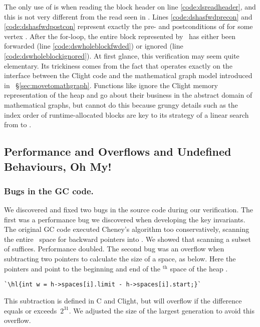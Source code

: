 The only use of  is when
reading the block header on line \ref{code:dsreadheader}, 
and this is not very different from the read seen in . 
Lines \ref{code:dshasfwdprecon} and \ref{code:dshasfwdpostcon} 
represent exactly the pre- and postconditions of 
for some vertex . 
After the for-loop, the entire block represented by~ has either been
forwarded (line \ref{code:dswholeblockfwded}) or 
ignored (line \ref{code:dswholeblockignored}). 
At first glance, this verification may seem quite elementary. 
Its trickiness comes from the fact
that  operates exactly on the interface between the Clight code 
and the mathematical graph model introduced in ~\S\ref{sec:movetomathgraph}.
Functions like  ignore the Clight memory representation 
of the heap and go about their business in the abstract domain
of mathematical graphs, but  cannot do this because grungy 
details such as the index order of runtime-allocated blocks are key to its strategy of a
linear search from  to .


\subsection{Performance and Overflows and Undefined Behaviours, Oh My!} \label{sec:gcissues}
\label{sec:gcissues}

\subsubsection*{Bugs in the GC code.}
We discovered and fixed two bugs in the source code during our verification.
The first was a performance bug we discovered when developing the key invariants.
The original GC code executed Cheney's algorithm too conservatively,
scanning the entire~ space for backward pointers into . We
showed that scanning a subset of  suffices.  Performance doubled.
The second bug was an overflow when subtracting two pointers
to calculate the size of a space, as below. Here the pointers  and 
point to the beginning and end of the $^{\text{th}}$ space of the
heap .
\begin{lstlisting}[numbers=none]
  `\hl{int w = h->spaces[i].limit - h->spaces[i].start;}`
\end{lstlisting}
This subtraction is defined in C and Clight, but
will overflow if the difference equals
or exceeds~$2^{31}$. We adjusted the size of the largest generation to avoid this overflow.

